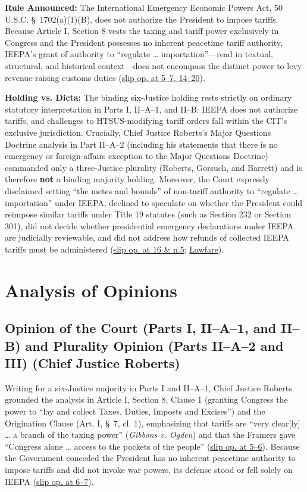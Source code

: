 \documentclass[12pt]{article}
\begin{document}
\textbf{Rule Announced:} The International Emergency Economic Powers Act, 50 U.S.C. \S~1702(a)(1)(B), does not authorize the President to impose tariffs. Because Article I, Section 8 vests the taxing and tariff power exclusively in Congress and the President possesses no inherent peacetime tariff authority, IEEPA's grant of authority to ``regulate \ldots{} importation''---read in textual, structural, and historical context---does not encompass the distinct power to levy revenue-raising customs duties (\href{https://www.supremecourt.gov/opinions/25pdf/24-1287_4gcj.pdf}{slip op. at 5--7, 14--20}).

\textbf{Holding vs. Dicta:} The binding six-Justice holding rests strictly on ordinary statutory interpretation in Parts I, II--A--1, and II--B: IEEPA does not authorize tariffs, and challenges to HTSUS-modifying tariff orders fall within the CIT's exclusive jurisdiction. Crucially, Chief Justice Roberts's Major Questions Doctrine analysis in Part II--A--2 (including his statements that there is no emergency or foreign-affairs exception to the Major Questions Doctrine) commanded only a three-Justice plurality (Roberts, Gorsuch, and Barrett) and is therefore \textbf{not} a binding majority holding. Moreover, the Court expressly disclaimed setting ``the metes and bounds'' of non-tariff authority to ``regulate \ldots{} importation'' under IEEPA, declined to speculate on whether the President could reimpose similar tariffs under Title 19 statutes (such as Section 232 or Section 301), did not decide whether presidential emergency declarations under IEEPA are judicially reviewable, and did not address how refunds of collected IEEPA tariffs must be administered (\href{https://www.law.cornell.edu/supremecourt/text/24-1287}{slip op. at 16 \& n.5}; \href{https://www.lawfaremedia.org/article/constitutional-duels-in-the-court-s-rejection-of-trump-s-tariffs}{Lawfare}).

\section{Analysis of Opinions}

\subsection{Opinion of the Court (Parts I, II--A--1, and II--B) and Plurality Opinion (Parts II--A--2 and III) (Chief Justice Roberts)}
Writing for a six-Justice majority in Parts I and II--A--1, Chief Justice Roberts grounded the analysis in Article I, Section 8, Clause 1 (granting Congress the power to ``lay and collect Taxes, Duties, Imposts and Excises'') and the Origination Clause (Art. I, \S~7, cl. 1), emphasizing that tariffs are ``very clear[ly] \ldots{} a branch of the taxing power'' (\textit{Gibbons v. Ogden}) and that the Framers gave ``Congress alone \ldots{} access to the pockets of the people'' (\href{https://www.law.cornell.edu/supremecourt/text/24-1287}{slip op. at 5--6}). Because the Government conceded the President has no inherent peacetime authority to impose tariffs and did not invoke war powers, its defense stood or fell solely on IEEPA (\href{https://www.law.cornell.edu/supremecourt/text/24-1287}{slip op. at 6--7}).
\end{document}
